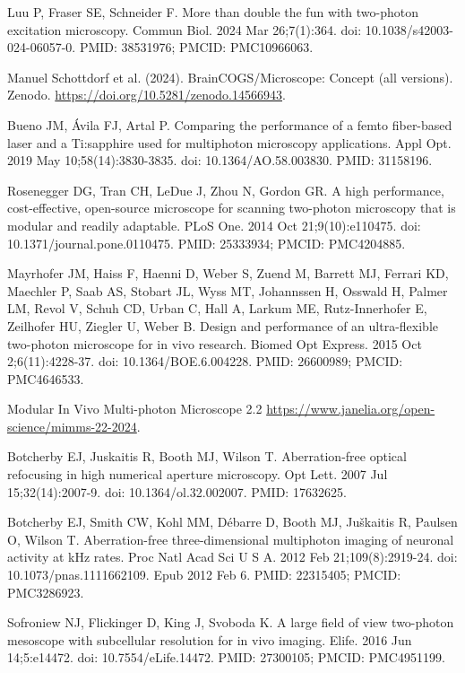 \documentclass[10pt,letterpaper]{article}
\begin{document}
\begin{thebibliography}{10}
Luu P, Fraser SE, Schneider F. More than double the fun with two-photon excitation microscopy. Commun Biol. 2024 Mar 26;7(1):364. doi: 10.1038/s42003-024-06057-0. PMID: 38531976; PMCID: PMC10966063.

Manuel Schottdorf et al. (2024). BrainCOGS/Microscope: Concept (all versions). Zenodo. \url{https://doi.org/10.5281/zenodo.14566943}.

Bueno JM, Ávila FJ, Artal P. Comparing the performance of a femto fiber-based laser and a Ti:sapphire used for multiphoton microscopy applications. Appl Opt. 2019 May 10;58(14):3830-3835. doi: 10.1364/AO.58.003830. PMID: 31158196.

Rosenegger DG, Tran CH, LeDue J, Zhou N, Gordon GR. A high performance, cost-effective, open-source microscope for scanning two-photon microscopy that is modular and readily adaptable. PLoS One. 2014 Oct 21;9(10):e110475. doi: 10.1371/journal.pone.0110475. PMID: 25333934; PMCID: PMC4204885.

Mayrhofer JM, Haiss F, Haenni D, Weber S, Zuend M, Barrett MJ, Ferrari KD, Maechler P, Saab AS, Stobart JL, Wyss MT, Johannssen H, Osswald H, Palmer LM, Revol V, Schuh CD, Urban C, Hall A, Larkum ME, Rutz-Innerhofer E, Zeilhofer HU, Ziegler U, Weber B. Design and performance of an ultra-flexible two-photon microscope for in vivo research. Biomed Opt Express. 2015 Oct 2;6(11):4228-37. doi: 10.1364/BOE.6.004228. PMID: 26600989; PMCID: PMC4646533.

Modular In Vivo Multi-photon Microscope 2.2 \url{https://www.janelia.org/open-science/mimms-22-2024}.

Botcherby EJ, Juskaitis R, Booth MJ, Wilson T. Aberration-free optical refocusing in high numerical aperture microscopy. Opt Lett. 2007 Jul 15;32(14):2007-9. doi: 10.1364/ol.32.002007. PMID: 17632625.

Botcherby EJ, Smith CW, Kohl MM, Débarre D, Booth MJ, Juškaitis R, Paulsen O, Wilson T. Aberration-free three-dimensional multiphoton imaging of neuronal activity at kHz rates. Proc Natl Acad Sci U S A. 2012 Feb 21;109(8):2919-24. doi: 10.1073/pnas.1111662109. Epub 2012 Feb 6. PMID: 22315405; PMCID: PMC3286923.

Sofroniew NJ, Flickinger D, King J, Svoboda K. A large field of view two-photon mesoscope with subcellular resolution for in vivo imaging. Elife. 2016 Jun 14;5:e14472. doi: 10.7554/eLife.14472. PMID: 27300105; PMCID: PMC4951199.


\end{thebibliography}
\end{document}
